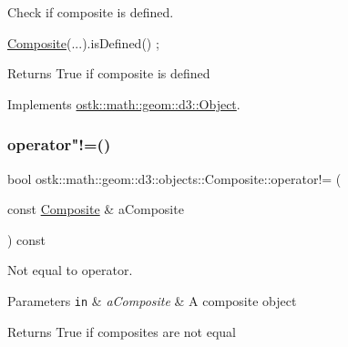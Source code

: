 Check if composite is defined. 


\begin{DoxyCode}
\hyperlink{classostk_1_1math_1_1geom_1_1d3_1_1objects_1_1_composite_aaecda2f184484d63a52de87706a37d4c}{Composite}(...).isDefined() ;
\end{DoxyCode}


\begin{DoxyReturn}{Returns}
True if composite is defined 
\end{DoxyReturn}


Implements \hyperlink{classostk_1_1math_1_1geom_1_1d3_1_1_object_a271a1964cd208be85ce9a0a429395ad8}{ostk\+::math\+::geom\+::d3\+::\+Object}.

\mbox{\label{classostk_1_1math_1_1geom_1_1d3_1_1objects_1_1_composite_aa215a94dadd9a8912760c5c5ec4eb6e1}} 
\subsubsection{\texorpdfstring{operator"!=()}{operator!=()}}
{\footnotesize\ttfamily bool ostk\+::math\+::geom\+::d3\+::objects\+::\+Composite\+::operator!= (\begin{DoxyParamCaption}\item[{const \hyperlink{classostk_1_1math_1_1geom_1_1d3_1_1objects_1_1_composite}{Composite} \&}]{a\+Composite }\end{DoxyParamCaption}) const}



Not equal to operator. 


\begin{DoxyParams}[1]{Parameters}
\mbox{\tt in}  & {\em a\+Composite} & A composite object \\
\hline
\end{DoxyParams}
\begin{DoxyReturn}{Returns}
True if composites are not equal 
\end{DoxyReturn}
\mbox{\label{classostk_1_1math_1_1geom_1_1d3_1_1objects_1_1_composite_a15a01835377b51a08b748762bc29411b}} 
